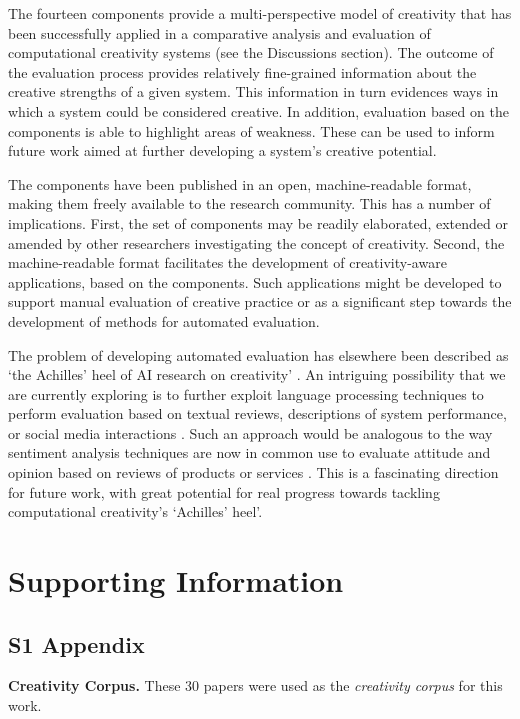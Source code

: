 \documentclass[10pt,letterpaper]{article}
\begin{document}
The fourteen components provide a multi-perspective model of creativity that has been successfully applied in a comparative analysis and evaluation of computational creativity systems \cite{jordanous12cc,jordanousphd,jordanous16aisb} (see the Discussions section). The outcome of the evaluation process provides relatively fine-grained information about the creative strengths of a given system. This information in turn evidences ways in which a system could be considered creative. In addition, evaluation based on the components is able to highlight areas of weakness. These can be used to inform future work aimed at further developing a system's creative potential.

The components have been published in an open, machine-readable format, making them freely available to the research community. This has a number of implications. First, the set of components may be readily elaborated, extended or amended by other researchers investigating the concept of creativity. Second, the machine-readable format facilitates the development of creativity-aware applications, based on the components. Such applications might be developed to support manual evaluation of creative practice or as a significant step towards the development of methods for automated evaluation.

The problem of developing automated evaluation has elsewhere been described as `the Achilles' heel of AI research on creativity' \cite{boden99}.  An intriguing possibility that we are currently exploring is to further exploit language processing techniques to perform evaluation based on textual reviews, descriptions of system performance, or social media interactions \cite{jordanous15vem}. Such an approach would be analogous to the way sentiment analysis techniques are now in common use to evaluate attitude and opinion based on reviews of products or services \cite{panglee08}. This is a fascinating direction for future work, with great potential for real progress towards tackling computational creativity's `Achilles' heel'.




\section*{Supporting Information}


\subsection*{S1 Appendix}\label{S1_Appendix}
{\bf Creativity Corpus.}  These 30 papers were used as the {\em creativity corpus} for this work.
\end{document}
